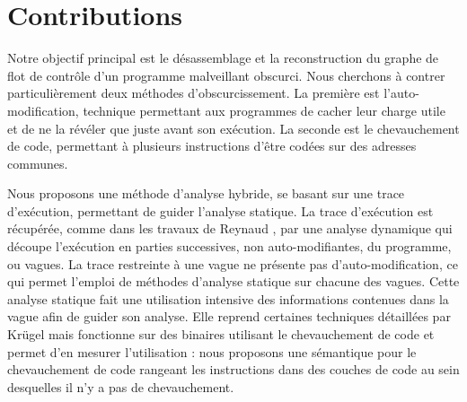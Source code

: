 \section*{Contributions}
% 
Notre objectif principal est le désassemblage et la reconstruction du graphe de flot de contrôle d'un programme malveillant obscurci.
Nous cherchons à contrer particulièrement deux méthodes d'obscurcissement. 
La première est l'auto-modification, technique permettant aux programmes de cacher leur charge utile et de ne la révéler que juste avant son exécution. La seconde est le chevauchement de code, permettant à plusieurs instructions d'être codées sur des adresses communes.


Nous proposons une méthode d'analyse hybride, se basant sur une trace d'exécution, permettant de guider l'analyse statique.
La trace d'exécution est récupérée, comme dans les travaux de Reynaud \cite{Reynaud2010}, par une analyse dynamique qui découpe l'exécution en parties successives, non auto-modifiantes, du programme, ou vagues.
La trace restreinte à une vague ne présente pas d'auto-modification, ce qui permet l'emploi de méthodes d'analyse statique sur chacune des vagues.
Cette analyse statique fait une utilisation intensive des informations contenues dans la vague afin de guider son analyse.
Elle reprend certaines techniques détaillées par Krügel \cite{KruegelRVV04} mais fonctionne sur des binaires utilisant le chevauchement de code et permet d'en mesurer l'utilisation : nous proposons une sémantique pour le chevauchement de code rangeant les instructions dans des couches de code au sein desquelles il n'y a pas de chevauchement.

